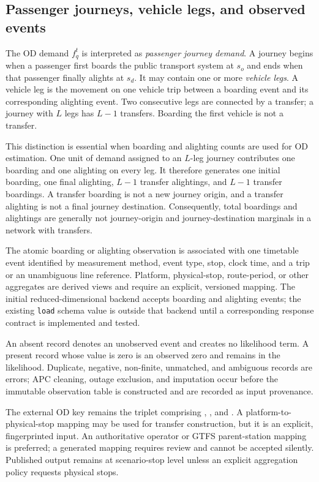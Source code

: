 \subsection{Passenger journeys, vehicle legs, and observed events}
\label{sec:journey-leg-event-contract}

The OD demand $f_q^t$ is interpreted as \emph{passenger journey demand}.  A
journey begins when a passenger first boards the public transport system at
$s_o$ and ends when that passenger finally alights at $s_d$.  It may contain
one or more \emph{vehicle legs}.  A vehicle leg is the movement on one vehicle
trip between a boarding event and its corresponding alighting event.  Two
consecutive legs are connected by a transfer; a journey with $L$ legs has
$L-1$ transfers.  Boarding the first vehicle is not a transfer.

This distinction is essential when boarding and alighting counts are used for
OD estimation.  One unit of demand assigned to an $L$-leg journey contributes
one boarding and one alighting on every leg.  It therefore generates one
initial boarding, one final alighting, $L-1$ transfer alightings, and $L-1$
transfer boardings.  A transfer boarding is not a new journey origin, and a
transfer alighting is not a final journey destination.  Consequently, total
boardings and alightings are generally not journey-origin and
journey-destination marginals in a network with transfers.

The atomic boarding or alighting observation is associated with one timetable
event identified by measurement method, event type, stop, clock time, and a
trip or an unambiguous line reference.  Platform, physical-stop, route-period,
or other aggregates are derived views and require an explicit, versioned
mapping.  The initial reduced-dimensional backend accepts boarding and
alighting events; the existing \texttt{load} schema value is outside that
backend until a corresponding response contract is implemented and tested.

An absent record denotes an unobserved event and creates no likelihood term.  A
present record whose value is zero is an observed zero and remains in the
likelihood.  Duplicate, negative, non-finite, unmatched, and ambiguous records
are errors; APC cleaning, outage exclusion, and imputation occur before the
immutable observation table is constructed and are recorded as input
provenance.

The external OD key remains the triplet comprising
, , and .  A
platform-to-physical-stop mapping may be used for transfer construction, but it
is an explicit, fingerprinted input.  An authoritative operator or GTFS
parent-station mapping is preferred; a generated mapping requires review and
cannot be accepted silently.  Published output remains at scenario-stop level
unless an explicit aggregation policy requests physical stops.

